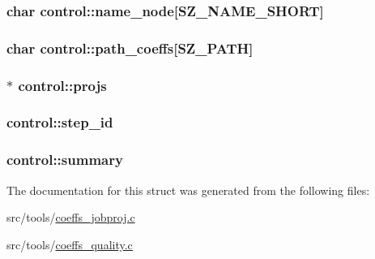\subsubsection[{\texorpdfstring{name\+\_\+node}{name_node}}]{\setlength{\rightskip}{0pt plus 5cm}char control\+::name\+\_\+node\mbox{[}{\bf S\+Z\+\_\+\+N\+A\+M\+E\+\_\+\+S\+H\+O\+RT}\mbox{]}}\hypertarget{structcontrol_a468bfded513333b2191ea4dcecd52d7f}{}\label{structcontrol_a468bfded513333b2191ea4dcecd52d7f}
\subsubsection[{\texorpdfstring{path\+\_\+coeffs}{path_coeffs}}]{\setlength{\rightskip}{0pt plus 5cm}char control\+::path\+\_\+coeffs\mbox{[}{\bf S\+Z\+\_\+\+P\+A\+TH}\mbox{]}}\hypertarget{structcontrol_a4a9fe143850eab7bc8908ae309713005}{}\label{structcontrol_a4a9fe143850eab7bc8908ae309713005}
\subsubsection[{\texorpdfstring{projs}{projs}}]{$\ast$ control\+::projs}\hypertarget{structcontrol_ab8a72c0f5de8d4f3dfe74f75c59116e1}{}\label{structcontrol_ab8a72c0f5de8d4f3dfe74f75c59116e1}
\subsubsection[{\texorpdfstring{step\+\_\+id}{step_id}}]{ control\+::step\+\_\+id}\hypertarget{structcontrol_a5c60a2ddd48af987e6e6f169f0bce418}{}\label{structcontrol_a5c60a2ddd48af987e6e6f169f0bce418}
\subsubsection[{\texorpdfstring{summary}{summary}}]{ control\+::summary}\hypertarget{structcontrol_a83bc735a6e6d51728d78ba73bcbaf393}{}\label{structcontrol_a83bc735a6e6d51728d78ba73bcbaf393}


The documentation for this struct was generated from the following files\+:\begin{DoxyCompactItemize}
\item 
src/tools/\hyperlink{coeffs__jobproj_8c}{coeffs\+\_\+jobproj.\+c}\item 
src/tools/\hyperlink{coeffs__quality_8c}{coeffs\+\_\+quality.\+c}\end{DoxyCompactItemize}

